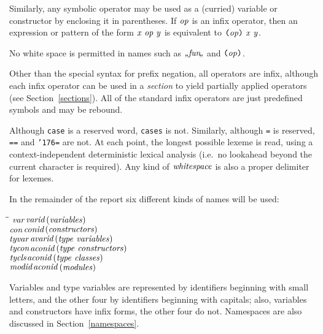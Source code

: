 Similarly, any symbolic operator may be used as a (curried) variable
or constructor by enclosing it in parentheses.  If \mbox{$\it op$} is an infix
operator, then an expression or pattern of the form \mbox{\mbox{$\it x\ op\ y$}} is
equivalent to {\mbox{$\it \makebox{\tt (}op\makebox{\tt )}\ x\ y$}}.

No white space is permitted in names such as \mbox{$\it \bkqB{fun}\bkqA$} and
\mbox{$\it \makebox{\tt (}op\makebox{\tt )}$}.

Other than the special syntax for prefix negation, all operators are
infix, although each infix operator can be used in a {\em
section} to yield partially applied operators (see
Section~\ref{sections}).
All of the standard infix operators are just
predefined symbols and may be rebound.

Although \mbox{\tt case} is a reserved word, \mbox{\tt cases} is not.
Similarly, although \mbox{\tt =} is reserved, \mbox{\tt ==} and \mbox{\tt {\char'176}=} are
not.  At each point, the longest possible lexeme
is read, using a context-independent deterministic lexical analysis
(i.e.~no lookahead beyond the current character is required).
Any kind of \mbox{$\it whitespace$} is also a proper delimiter for lexemes.

In the remainder of the report six different kinds of 
names will be used:
\begin{flushleft}\it\begin{tabbing}
\hspace{0.5in}\=\hspace{3.0in}\=\kill
$\it var$\>\makebox[3.5em]{$\rightarrow$}$\it varid$\>\makebox[3em]{}$\it (variables)$\\ 
$\it con$\>\makebox[3.5em]{$\rightarrow$}$\it conid$\>\makebox[3em]{}$\it (constructors)$\\ 
$\it tyvar$\>\makebox[3.5em]{$\rightarrow$}$\it avarid$\>\makebox[3em]{}$\it (type\ variables)$\\ 
$\it tycon$\>\makebox[3.5em]{$\rightarrow$}$\it aconid$\>\makebox[3em]{}$\it (type\ constructors)$\\ 
$\it tycls$\>\makebox[3.5em]{$\rightarrow$}$\it aconid$\>\makebox[3em]{}$\it (type\ classes)$\\ 
$\it modid$\>\makebox[3.5em]{$\rightarrow$}$\it aconid$\>\makebox[3em]{}$\it (modules)$
\end{tabbing}\end{flushleft}
%
%
%
%
%
%
Variables and type variables are represented by identifiers beginning
with small letters, and the other four by identifiers beginning with
capitals; also, variables and constructors have infix forms, the other
four do not.  Namespaces are also discussed in
Section~\ref{namespaces}.

